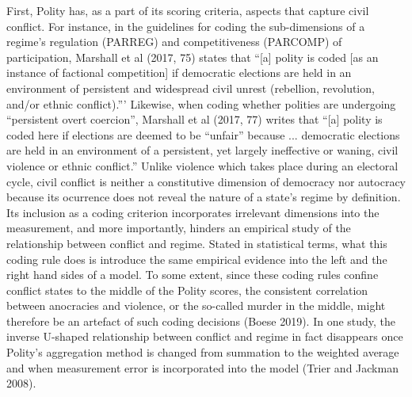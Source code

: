 \documentclass [11pt]{article}
\begin{document}
First, Polity has, as a part of its scoring criteria, aspects that capture civil conflict. For instance, in the guidelines for coding the sub-dimensions of a regime's regulation (PARREG) and competitiveness (PARCOMP) of participation, Marshall et al (2017, 75) states that ``[a] polity is coded [as an instance of factional competition] if democratic elections are held in an environment of persistent and widespread civil unrest (rebellion, revolution, and/or ethnic conflict).''' Likewise, when coding whether polities are undergoing ``persistent overt coercion'', Marshall et al (2017, 77) writes that ``[a] polity is coded here if elections are deemed to be “unfair” because ... democratic elections are held in an environment of a persistent, yet largely ineffective or waning, civil violence or ethnic conflict.'' Unlike violence which takes place during an electoral cycle, civil conflict is neither a constitutive dimension of democracy nor autocracy because its ocurrence does not reveal the nature of a state's regime by definition. Its inclusion as a coding criterion incorporates irrelevant dimensions into the measurement, and more importantly, hinders an empirical study of the relationship between conflict and regime. Stated in statistical terms, what this coding rule does is introduce the same empirical evidence into the left and the right hand sides of a model. To some extent, since these coding rules confine conflict states to the middle of the Polity scores, the consistent correlation between anocracies and violence, or the so-called murder in the middle, might therefore be an artefact of such coding decisions (Boese 2019). In one study, the inverse U-shaped relationship between conflict and regime in fact disappears once Polity's aggregation method is changed from summation to the weighted average and when measurement error is incorporated into the model (Trier and Jackman 2008).
\end{document}
